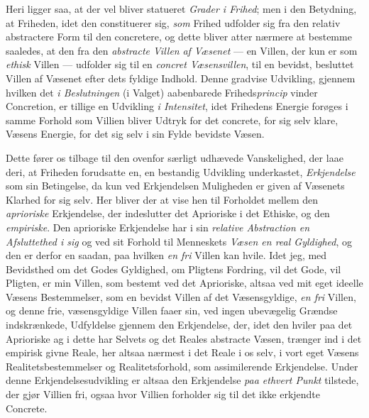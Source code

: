 Heri ligger saa, at der vel bliver statueret \emph{Grader i Frihed}; men i den
Betydning, at Friheden, idet den constituerer sig, \emph{som} Frihed udfolder sig
fra den relativ abstractere Form til den concretere, og dette bliver atter
nærmere at bestemme saaledes, at den fra den \emph{abstracte Villen}
 \emph{af Væsenet} --- en Villen, der kun er som \emph{ethisk} Villen ---
udfolder sig til en \emph{concret Væsensvillen}, til en bevidst, besluttet
Villen af Væsenet efter dets fyldige Indhold. Denne gradvise Udvikling, gjennem
hvilken det \emph{i Beslutningen} (i Valget) aabenbarede
Friheds\emph{princip} vinder Concretion, er tillige en Udvikling \emph{i
Intensitet}, idet Frihedens Energie forøges i samme Forhold som Villien bliver
Udtryk for det concrete, for sig selv klare, Væsens Energie, for det sig selv i
sin Fylde bevidste Væsen.

Dette fører os tilbage til den ovenfor særligt udhævede Vanskelighed, der laae
deri, at Friheden forudsatte en, en bestandig Udvikling underkastet,
\emph{Erkjendelse} som sin Betingelse, da kun ved Erkjendelsen Muligheden er
given af Væsenets Klarhed for sig selv. Her bliver der at vise hen til Forholdet
mellem den \emph{aprioriske} Erkjendelse, der indeslutter det Aprioriske i det
Ethiske, og den \emph{empiriske}. Den aprioriske Erkjendelse har i sin
\emph{relative Abstraction en Afsluttethed i sig} og ved sit Forhold til
Menneskets \emph{Væsen en real Gyldighed}, og den er derfor en saadan, paa
hvilken \emph{en fri} Villen kan hvile. Idet jeg, med Bevidsthed om det Godes
Gyldighed, om Pligtens Fordring, vil det Gode, vil Pligten, er min Villen, som
bestemt ved det Aprioriske, altsaa ved mit eget ideelle Væsens Bestemmelser, som
en bevidst Villen af det Væsensgyldige, \emph{en fri} Villen, og denne frie,
væsensgyldige Villen faaer sin, ved ingen ubevægelig Grændse indskrænkede,
Udfyldelse gjennem den Erkjendelse, der, idet den hviler paa det Aprioriske ag i
dette har Selvets og det Reales abstracte Væsen, trænger ind i det empirisk
givne Reale, her altsaa nærmest i det Reale i os selv, i vort eget Væsens
Realitetsbestemmelser og Realitetsforhold, som assimilerende Erkjendelse. Under
denne Erkjendelsesudvikling er altsaa den Erkjendelse \emph{paa ethvert Punkt}
tilstede, der gjør Villien fri, ogsaa hvor Villien forholder sig til det ikke
erkjendte Concrete.

